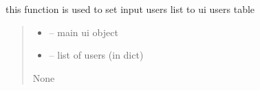 \documentclass[letterpaper,10pt,english]{sphinxmanual}
\begin{document}
\begin{savenotes}\begin{fulllineitems}
\label{\detokenize{setting/backend/user_management_funcs:oxin.backend.user_management_funcs.set_users_on_ui}}
\pysigstartsignatures
{}
\pysigstopsignatures
\sphinxAtStartPar
this function is used to set input users list to ui users table
\begin{quote}\begin{description}
\begin{itemize}
\item {} 
\sphinxAtStartPar
{} – main ui object

\item {} 
\sphinxAtStartPar
{} – list of users (in dict)

\end{itemize}

\sphinxAtStartPar
None

\end{description}\end{quote}

\end{fulllineitems}\end{savenotes}

\end{document}
